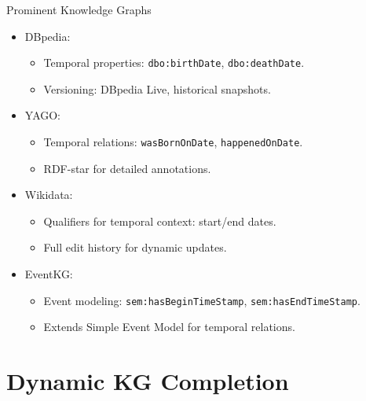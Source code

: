 \documentclass{beamer}
\begin{document}
    \begin{frame}{Prominent Knowledge Graphs}
        \begin{itemize}
            \item DBpedia:
            \begin{itemize}
                \item Temporal properties: \texttt{dbo:birthDate}, \texttt{dbo:deathDate}.
                \item Versioning: DBpedia Live, historical snapshots.
            \end{itemize}
            \item YAGO:
            \begin{itemize}
                \item Temporal relations: \texttt{wasBornOnDate}, \texttt{happenedOnDate}.
                \item RDF-star for detailed annotations.
            \end{itemize}
            \item Wikidata:
            \begin{itemize}
                \item Qualifiers for temporal context: start/end dates.
                \item Full edit history for dynamic updates.
            \end{itemize}
            \item EventKG:
            \begin{itemize}
                \item Event modeling: \texttt{sem:hasBeginTimeStamp}, \texttt{sem:hasEndTimeStamp}.
                \item Extends Simple Event Model for temporal relations.
            \end{itemize}
        \end{itemize}
    \end{frame}
     

    \section{Dynamic KG Completion}
\end{document}
